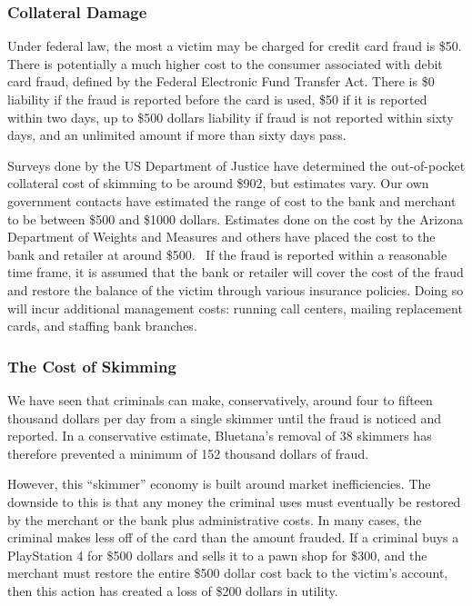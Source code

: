 \subsubsection{Collateral Damage}

Under federal law, the most a victim may be charged for credit card fraud is \$50. \cite{cornellliability}
%
There is potentially a much higher cost to the consumer associated with debit card fraud, defined by the
Federal Electronic Fund Transfer Act.
%
There is \$0 liability if the fraud is reported before the card is used, \$50 if it is reported within two days,
up to \$500 dollars liability if fraud is not reported within sixty days, and an unlimited amount if more
than sixty days pass. \cite{1693g}

Surveys done by the US Department of Justice have determined the out-of-pocket collateral cost of skimming to be around
\$902, but estimates vary. \cite{harrell2017}
%
Our own government contacts have estimated the range of cost to the bank and merchant to be between \$500 and \$1000
dollars.
%
Estimates done on the cost by the Arizona Department of Weights and Measures and others have placed the cost to the
bank and retailer at around \$500.~\cite{arizonareport, rippleshot}
%
If the fraud is reported within a reasonable time frame, it is assumed that the bank or retailer will cover the cost of
the fraud and restore the balance of the victim through various insurance policies.
%
Doing so will incur additional management costs: running call centers, mailing replacement cards, and staffing bank
branches.

\subsubsection{The Cost of Skimming}

We have seen that criminals can make, conservatively, around four to fifteen thousand dollars per day from a single
skimmer until the fraud is noticed and reported.
%
In a conservative estimate, Bluetana's removal of 38 skimmers has therefore prevented a minimum of
152 thousand dollars of fraud.


However, this ``skimmer'' economy is built around market inefficiencies.
%
The downside to this is that any money the criminal uses must eventually be restored by the merchant or the bank plus
administrative costs.
%
In many cases, the criminal makes less off of the card than the amount frauded.
%
If a criminal buys a PlayStation 4 for \$500 dollars and sells it to a pawn shop for \$300, and the merchant must
restore the entire \$500 dollar cost back to the victim's account, then this action has created a loss of \$200
dollars in utility.

